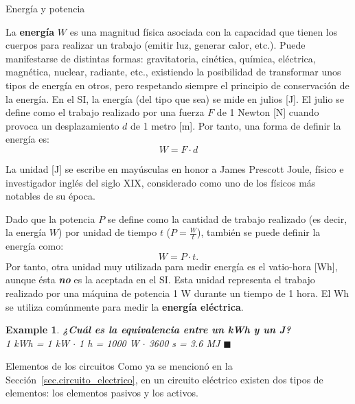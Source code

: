 \documentclass[11pt]{book} %
\makeatletter
\numberwithin{dummy}{section}
\theoremstyle{ocrenumbox}
\theoremstyle{blacknumex}
\newtheorem{exampleT}{Example}[chapter]
\theoremstyle{blacknumbox}
\theoremstyle{ocrenum}
\newenvironment{example}{\begin{exampleT}}{\hfill{\tiny\ensuremath{\blacksquare}}\end{exampleT}}
\newenvironment{remark}{\par\vspace{10pt}\small %
\begin{list}{}{
\leftmargin=35pt %
\rightmargin=25pt}\item\ignorespaces %
\makebox[-2.5pt]{\begin{tikzpicture}[overlay]
\node[draw=ocre!60,line width=1pt,circle,fill=ocre!25,font=\sffamily\bfseries,inner sep=2pt,outer sep=0pt] at (-15pt,0pt){\textcolor{ocre}{N}};\end{tikzpicture}} %
\advance\baselineskip -1pt}{\end{list}\vskip5pt} %
\renewcommand{\section}{\@startsection{section}{1}{\z@}
{-4ex \@plus -1ex \@minus -.4ex}
{1ex \@plus.2ex }
{\normalfont\large\sffamily\bfseries}}
\renewcommand{\subsubsection}{\@startsection {subsubsection}{3}{\z@}
{-2ex \@plus -0.1ex \@minus -.2ex}
{.2ex \@plus.2ex }
{\normalfont\small\sffamily\bfseries}}
\newlength\esp
\makeatother
\begin{document}
	\subsubsection{Energía y potencia}
	
	La \textbf{energía} $W$ es una magnitud física asociada con la capacidad que tienen los cuerpos para realizar un trabajo (emitir luz, generar calor, etc.). Puede manifestarse de distintas formas: gravitatoria, cinética, química, eléctrica, magnética, nuclear, radiante, etc., existiendo la posibilidad de transformar unos tipos de energía en otros, pero respetando siempre el principio de conservación de la energía. En el SI, la energía (del tipo que sea) se mide en julios [J]. El julio se define como el trabajo realizado por una fuerza $F$ de 1 Newton [N] cuando provoca un desplazamiento $d$ de 1 metro [m]. Por tanto, una forma de definir la energía es:
	\begin{equation*}
		W=F\cdot d 
	\end{equation*}
	\begin{remark}
		La unidad [J] se escribe en mayúsculas en honor a James Prescott Joule, físico e investigador inglés del siglo XIX, considerado como uno de los físicos más notables de su época. 
	\end{remark}
	
	Dado que la potencia $P$ se define como la cantidad de trabajo realizado (es decir, la energía $W$) por unidad de tiempo $t$ ($P=\frac{W}{t}$), también se puede definir la energía como:
	\begin{equation*}\label{eq.Ept}
		W=P\cdot t.
	\end{equation*}
	Por tanto, otra unidad muy utilizada para medir energía es el vatio-hora [Wh], aunque ésta \textbf{\emph{no}} es la aceptada en el SI. Esta unidad representa el trabajo realizado por una máquina de potencia 1 W durante un tiempo de 1 hora. El Wh se utiliza comúnmente para medir la \textbf{energía eléctrica}. 
	
	\vspace{4mm}
	\begin{example}
		\textbf{¿Cuál es la equivalencia entre un kWh y un J?}\\
		1 kWh = 1 kW $\cdot$ 1 h = 1000 W $\cdot$ 3600 s = 3.6 MJ 
	\end{example}
	
	\section{Elementos de los circuitos}
	Como ya se mencionó en la Sección~\ref{sec.circuito_electrico}, en un circuito eléctrico existen dos tipos de elementos: los elementos pasivos y los activos.
	
\end{document}
